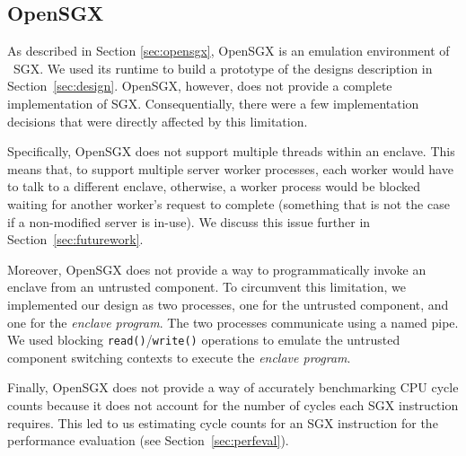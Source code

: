 \documentclass[../main.tex]{subfiles}
\begin{document}
\subsection{OpenSGX}
\label{subsec:opensgx}
As described in Section \ref{sec:opensgx}, OpenSGX is an emulation
environment of \Intel~SGX. We used its runtime to build a prototype of
the designs description in Section~\ref{sec:design}. OpenSGX, however,
does not provide a complete implementation of SGX. Consequentially,
there were a few implementation decisions that were directly affected
by this limitation.

Specifically, OpenSGX does not support multiple threads within an
enclave. This means that, to support multiple server worker processes,
each worker would have to talk to a different enclave, otherwise, a
worker process would be blocked waiting for another worker's request
to complete (something that is not the case if a non-modified server
is in-use). We discuss this issue further in
Section~\ref{sec:futurework}.

Moreover, OpenSGX does not provide a way to programmatically invoke an
enclave from an untrusted component. To circumvent this limitation, we
implemented our design as two processes, one for the untrusted
component, and one for the \textit{enclave program}. The two processes
communicate using a named pipe. We used blocking
\texttt{read()}/\texttt{write()} operations to emulate the untrusted
component switching contexts to execute the \textit{enclave program}.

Finally, OpenSGX does not provide a way of accurately benchmarking
CPU cycle counts because it does not account for the number of cycles
each SGX instruction requires. This led to us estimating cycle counts
for an SGX instruction for the performance evaluation (see
Section~\ref{sec:perfeval}).



\end{document}
